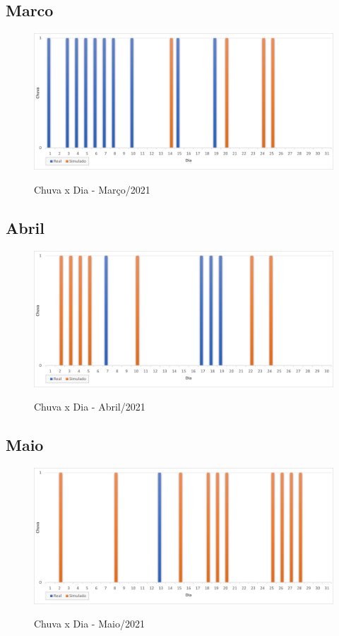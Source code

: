 \subsection{Marco}
\begin{figure}[H]
	\caption{\small Chuva x Dia - Março/2021}
	\centering
	\includegraphics[width=\textwidth]{figs/mar.png}
	\label{f.rmar}
\end{figure}

\subsection{Abril}
\begin{figure}[H]
	\caption{\small Chuva x Dia - Abril/2021}
	\centering
	\includegraphics[width=\textwidth]{figs/abr.png}
	\label{f.rabr}
\end{figure}

\subsection{Maio}
\begin{figure}[H]
	\caption{\small Chuva x Dia - Maio/2021}
	\centering
	\includegraphics[width=\textwidth]{figs/mai.png}
	\label{f.rmai}
\end{figure}

